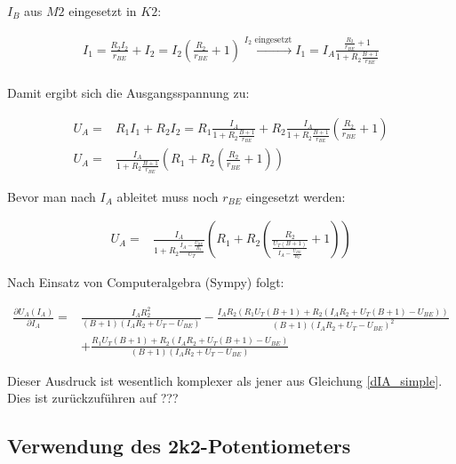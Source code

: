$I_B$ aus $M2$ eingesetzt in $K2$:

\begin{align*}
    I_1 = \frac{R_2 I_2}{r_{BE}} + I_2 = I_2 \left( \frac{R_2}{r_{BE}} + 1 \right) \xrightarrow[]{I_2 \text{ eingesetzt}} I_1 = I_A \frac{\frac{R_2}{r_{BE}} + 1}{1 + R_2\frac{B+1}{r_{BE}}} \\
\end{align*}

Damit ergibt sich die Ausgangsspannung zu: 

\begin{align*}
    U_A =& R_1 I_1 + R_2 I_2 = R_1 \frac{I_A}{1 + R_2\frac{B+1}{r_{BE}}} + R_2 \frac{I_A}{1 + R_2\frac{B+1}{r_{BE}}} \left( \frac{R_2}{r_{BE}} + 1 \right)\\
    U_A =& \frac{I_A}{1 + R_2\frac{B+1}{r_{BE}}} \left( R_1 + R_2 \left( \frac{R_2}{r_{BE}} + 1 \right) \right)
\end{align*}

Bevor man nach $I_A$ ableitet muss noch $r_{BE}$ eingesetzt werden:

\begin{align*}
    U_A =& \frac{I_A}{1 + R_2
    \frac{I_A - \frac{U_{BE}}{R_2}}{U_T}
    } \left( R_1 + R_2 \left( \frac{R_2}{\frac{U_T (B+1)}{I_A - \frac{U_{BE}}{R_2}}} + 1 \right) \right)
\end{align*}

Nach Einsatz von Computeralgebra (Sympy) folgt: 

\begin{align}
    \frac{\partial U_A (I_A)}{\partial I_A} =& \frac{I_{A} R_{2}^{2}}{\left(B + 1\right) \left(I_{A} R_{2} + U_{T} - U_{BE}\right)} - \frac{I_{A} R_{2} \left(R_{1} U_{T} \left(B + 1\right) + R_{2} \left(I_{A} R_{2} + U_{T} \left(B + 1\right) - U_{BE}\right)\right)}{\left(B + 1\right) \left(I_{A} R_{2} + U_{T} - U_{BE}\right)^{2}} \nonumber\\ &+ \frac{R_{1} U_{T} \left(B + 1\right) + R_{2} \left(I_{A} R_{2} + U_{T} \left(B + 1\right) - U_{BE}\right)}{\left(B + 1\right) \left(I_{A} R_{2} + U_{T} - U_{BE}\right)} \label{dIA_complex}
\end{align}

Dieser Ausdruck ist wesentlich komplexer als jener aus Gleichung \ref{dIA_simple}. Dies ist zurückzuführen auf ???

\subsection{Verwendung des 2k2-Potentiometers}

